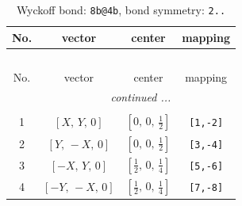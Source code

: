 \documentclass[fleqn,8pt]{jsarticle}
\begin{document}
\renewcommand{\arraystretch}{1.2}
\begin{longtable}{cccc}
\caption{Wyckoff bond: {\tt 8b@4b}, bond symmetry: {\tt 2..}}
 \\
 \hline \hline
No. & vector & center & mapping \\ \hline \endfirsthead

\multicolumn{3}{l}{\tablename\ \thetable{}} \\
 \hline \hline
No. & vector & center & mapping \\ \hline \endhead

 \hline \hline
\multicolumn{3}{r}{\footnotesize\it continued ...} \\ \endfoot

 \hline \hline
\multicolumn{3}{r}{} \\ \endlastfoot

1 & $\left[ X,\, Y,\, 0 \right]$ & $\left[ 0,\, 0,\, \frac{1}{2} \right]$ & {\tt [1,-2]} \\ \hline
2 & $\left[ Y,\, - X,\, 0 \right]$ & $\left[ 0,\, 0,\, \frac{1}{2} \right]$ & {\tt [3,-4]} \\ \hline
3 & $\left[ - X,\, Y,\, 0 \right]$ & $\left[ \frac{1}{2},\, 0,\, \frac{1}{4} \right]$ & {\tt [5,-6]} \\ \hline
4 & $\left[ - Y,\, - X,\, 0 \right]$ & $\left[ \frac{1}{2},\, 0,\, \frac{1}{4} \right]$ & {\tt [7,-8]} \\
\end{longtable}
\renewcommand{\arraystretch}{1.2}
\end{document}
